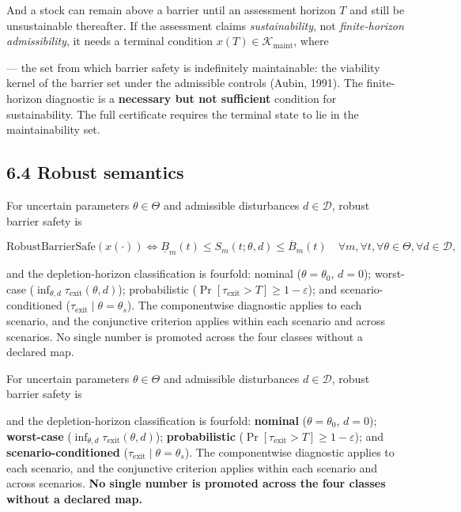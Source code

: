 \documentclass[11pt]{article}
\begin{document}
And a stock can remain above a barrier until an assessment horizon \(T\) and still be unsustainable thereafter. If the assessment claims \emph{sustainability}, not \emph{finite-horizon admissibility}, it needs a terminal condition \(x(T)\in\mathcal K_{\mathrm{maint}}\), where

--- the set from which barrier safety is indefinitely maintainable: the viability kernel of the barrier set under the admissible controls (Aubin, 1991). The finite-horizon diagnostic is a \textbf{necessary but not sufficient} condition for sustainability. The full certificate requires the terminal state to lie in the maintainability set.

\subsection*{6.4 Robust semantics}\label{64-robust-semantics}

For uncertain parameters \(\theta \in \Theta\) and admissible disturbances \(d \in \mathcal{D}\), robust barrier safety is 

$$\mathrm{RobustBarrierSafe}(x(\cdot)) \iff \underline{B}_m(t) \le S_m(t; \theta, d) \le \overline{B}_m(t) \quad \forall m, \forall t, \forall \theta \in \Theta, \forall d \in \mathcal{D},$$

 and the depletion-horizon classification is fourfold: nominal (\(\theta = \theta_0\), \(d = 0\)); worst-case (\(\inf_{\theta,\allowbreak{}d} \tau_{\mathrm{exit}}(\theta,\allowbreak{}d)\)); probabilistic (\(\Pr[\tau_{\mathrm{exit}} > T] \ge 1 - \varepsilon\)); and scenario-conditioned (\(\tau_{\mathrm{exit}} \mid \theta =\allowbreak{} \theta_s\)). The componentwise diagnostic applies to each scenario, and the conjunctive criterion applies within each scenario and across scenarios. No single number is promoted across the four classes without a declared map.

For uncertain parameters \(\theta\in\Theta\) and admissible disturbances \(d\in\mathcal D\), robust barrier safety is

and the depletion-horizon classification is fourfold: \textbf{nominal} (\(\theta=\theta_0\), \(d=0\)); \textbf{worst-case} (\(\inf_{\theta,\allowbreak{}d}\tau_{\mathrm{exit}}(\theta,\allowbreak{}d)\)); \textbf{probabilistic} (\(\Pr[\tau_{\mathrm{exit}}>T]\ge1-\varepsilon\)); and \textbf{scenario-conditioned} (\(\tau_{\mathrm{exit}}\mid\theta=\allowbreak{}\theta_s\)). The componentwise diagnostic applies to each scenario, and the conjunctive criterion applies within each scenario and across scenarios. \textbf{No single number is promoted across the four classes without a declared map.}
\end{document}
